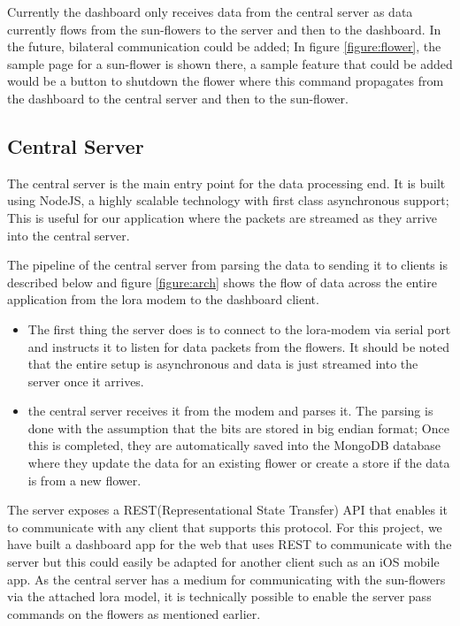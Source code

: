 Currently the dashboard only receives data from the central server as data currently flows from the sun-flowers to the server and then to the dashboard. In the future, bilateral communication could be added; In figure \ref{figure:flower}, the sample page for a sun-flower is shown there, a sample feature that could be added would be a button to shutdown the flower where this command propagates from the dashboard to the central server and then to the sun-flower.



\subsection{Central Server}
The central server is the main entry point for the data processing end. It is built using NodeJS, a highly scalable technology with first class asynchronous support; This is useful for our application where the packets are streamed as they arrive into the central server.

The pipeline of the central server from parsing the data to sending it to clients is described below and figure \ref{figure:arch} shows the flow of data across the entire application from the lora modem to the dashboard client.
\begin{itemize}
	\item The first thing the server does is to connect to the lora-modem via serial port and instructs it to listen for data packets from the flowers. It should be noted that the entire setup is asynchronous and data is just streamed into the server once it arrives.
	\item the central server receives it from the modem and parses it. The parsing is done with the assumption that the bits are stored in big endian format; Once this is completed, they are automatically saved into the MongoDB database where they update the data for an existing flower or create a store if the data is from a new flower.
\end{itemize} 

The server exposes a REST(Representational State Transfer) API that enables it to communicate with any client that supports this protocol. For this project, we have built a dashboard app for the web that uses REST to communicate with the server but this could easily be adapted for another client such as an iOS mobile app. 
As the central server has a medium for communicating with the sun-flowers via the attached lora model, it is technically possible to enable the server pass commands on the flowers as mentioned earlier.

